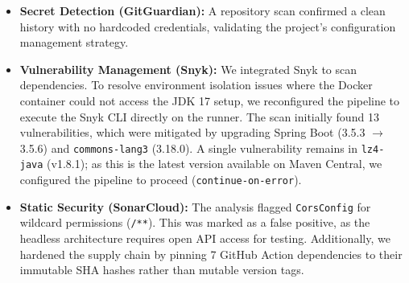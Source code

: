\begin{itemize}
    \item \textbf{Secret Detection (GitGuardian):} A repository scan confirmed a clean history with no hardcoded credentials, validating the project's configuration management strategy.
    \item \textbf{Vulnerability Management (Snyk):} We integrated Snyk to scan dependencies. To resolve environment isolation issues where the Docker container could not access the JDK 17 setup, we reconfigured the pipeline to execute the Snyk CLI directly on the runner. The scan initially found 13 vulnerabilities, which were mitigated by upgrading Spring Boot (3.5.3 $\rightarrow$ 3.5.6) and \texttt{commons-lang3} (3.18.0). A single vulnerability remains in \texttt{lz4-java} (v1.8.1); as this is the latest version available on Maven Central, we configured the pipeline to proceed (\texttt{continue-on-error}).
    \item \textbf{Static Security (SonarCloud):} The analysis flagged \texttt{CorsConfig} for wildcard permissions (\texttt{/**}). This was marked as a false positive, as the headless architecture requires open API access for testing. Additionally, we hardened the supply chain by pinning 7 GitHub Action dependencies to their immutable SHA hashes rather than mutable version tags.
\end{itemize}